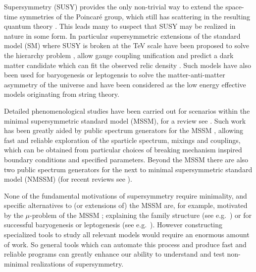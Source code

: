 \documentclass[final,3p,11pt,pdflatex]{elsarticle}
\begin{document}
Supersymmetry (SUSY) provides the only non-trivial way to extend the
space-time symmetries of the Poincar\'e
group, which still has scattering in the resulting quantum theory \cite{Coleman:1967ad,Haag:1974qh}. This leads many to suspect that
SUSY may be realized in nature in some form. In particular
supersymmetric extensions of the standard model (SM) where SUSY is broken
at the TeV scale have been proposed to solve the hierarchy
problem \cite{Weinberg:1975gm, Weinberg:1979bn, Gildener:1976ai,
  Susskind:1978ms, 'tHooft:1980xb}, allow gauge coupling
unification \cite{Langacker:1990jh, Ellis:1990wk, Amaldi:1991cn,
  Langacker:1991an, Giunti:1991ta} and predict a dark matter candidate
which can fit the observed relic
density \cite{Goldberg:1983nd,Ellis:1983ew}.  Such models have also
been used for baryogenesis or leptogensis to solve the
matter-anti-matter asymmetry of the universe and have been considered
as the low energy effective models originating from string
theory.

Detailed phenomenological studies have been carried out for scenarios
within the minimal supersymmetric standard model (MSSM), for a review
see \cite{Chung:2003fi}.  Such work has been greatly aided by public
spectrum generators for the MSSM
\cite{Allanach:2001kg,Porod:2003um,Djouadi:2002ze,Baer:1993ae,Chowdhury:2011zr},
allowing fast and reliable exploration of the sparticle spectrum,
mixings and couplings, which can be obtained from particular choices
of breaking mechanism inspired boundary conditions and specified
parameters. Beyond the MSSM there are also two public spectrum
generators \cite{Ellwanger:2004xm, Ellwanger:2005dv,
  Ellwanger:2006rn,Ellwanger:2008py, Allanach:2013kza} for the next to
minimal supersymmetric standard model (NMSSM)  (for
recent reviews see \cite{Ellwanger:2009dp, Maniatis:2009re}).



None of the fundamental motivations of supersymmetry require
minimality, and specific alternatives to (or extensions of) the MSSM
are, for example, motivated by the $\mu$-problem of the MSSM
\cite{Kim:1983dt}; explaining the family structure (see
e.g.~\cite{King:2014nza}) or for successful baryogenesis or
leptogenesis (see e.g.~\cite{King:2008qb}). However constructing
specialized tools to study all relevant models would require an
enormous amount of work.  So general tools which can automate this
process and produce fast and reliable programs can greatly enhance our
ability to understand and test non-minimal realizations of
supersymmetry.
\end{document}
